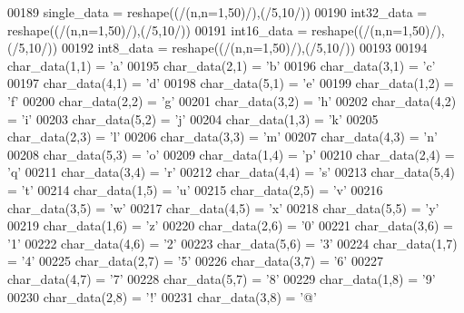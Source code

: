 \begin{DoxyCode}
00189         single\_data  = reshape((/(n,n=1,50)/),(/5,10/))
00190         int32\_data   = reshape((/(n,n=1,50)/),(/5,10/))
00191         int16\_data   = reshape((/(n,n=1,50)/),(/5,10/))
00192         int8\_data    = reshape((/(n,n=1,50)/),(/5,10/))
00193 
00194         char\_data(1,1)  = \textcolor{stringliteral}{'a'}
00195         char\_data(2,1)  = \textcolor{stringliteral}{'b'}
00196         char\_data(3,1)  = \textcolor{stringliteral}{'c'}
00197         char\_data(4,1)  = \textcolor{stringliteral}{'d'}
00198         char\_data(5,1)  = \textcolor{stringliteral}{'e'}
00199         char\_data(1,2)  = \textcolor{stringliteral}{'f'}
00200         char\_data(2,2)  = \textcolor{stringliteral}{'g'}
00201         char\_data(3,2)  = \textcolor{stringliteral}{'h'}
00202         char\_data(4,2)  = \textcolor{stringliteral}{'i'}
00203         char\_data(5,2) = \textcolor{stringliteral}{'j'}
00204         char\_data(1,3) = \textcolor{stringliteral}{'k'}
00205         char\_data(2,3) = \textcolor{stringliteral}{'l'}
00206         char\_data(3,3) = \textcolor{stringliteral}{'m'}
00207         char\_data(4,3) = \textcolor{stringliteral}{'n'}
00208         char\_data(5,3) = \textcolor{stringliteral}{'o'}
00209         char\_data(1,4) = \textcolor{stringliteral}{'p'}
00210         char\_data(2,4) = \textcolor{stringliteral}{'q'}
00211         char\_data(3,4) = \textcolor{stringliteral}{'r'}
00212         char\_data(4,4) = \textcolor{stringliteral}{'s'}
00213         char\_data(5,4) = \textcolor{stringliteral}{'t'}
00214         char\_data(1,5) = \textcolor{stringliteral}{'u'}
00215         char\_data(2,5) = \textcolor{stringliteral}{'v'}
00216         char\_data(3,5) = \textcolor{stringliteral}{'w'}
00217         char\_data(4,5) = \textcolor{stringliteral}{'x'}
00218         char\_data(5,5) = \textcolor{stringliteral}{'y'}
00219         char\_data(1,6) = \textcolor{stringliteral}{'z'}
00220         char\_data(2,6) = \textcolor{stringliteral}{'0'}
00221         char\_data(3,6) = \textcolor{stringliteral}{'1'}
00222         char\_data(4,6) = \textcolor{stringliteral}{'2'}
00223         char\_data(5,6) = \textcolor{stringliteral}{'3'}
00224         char\_data(1,7) = \textcolor{stringliteral}{'4'}
00225         char\_data(2,7) = \textcolor{stringliteral}{'5'}
00226         char\_data(3,7) = \textcolor{stringliteral}{'6'}
00227         char\_data(4,7) = \textcolor{stringliteral}{'7'}
00228         char\_data(5,7) = \textcolor{stringliteral}{'8'}
00229         char\_data(1,8) = \textcolor{stringliteral}{'9'}
00230         char\_data(2,8) = \textcolor{stringliteral}{'!'}
00231         char\_data(3,8) = \textcolor{stringliteral}{'@'}

\end{DoxyCode}

